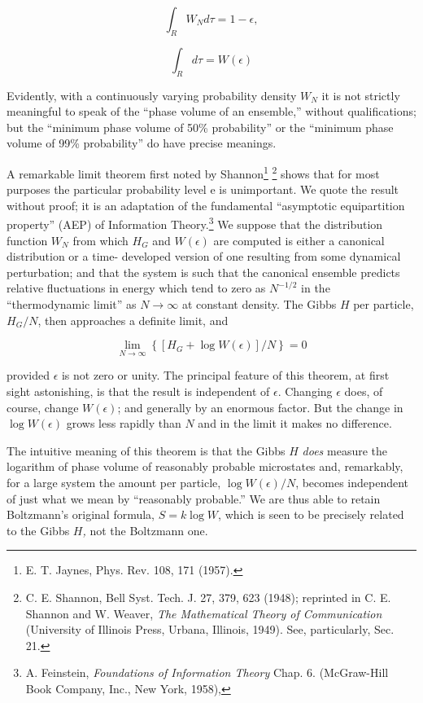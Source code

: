 \documentclass[twocolumn]{article}
\begin{document}
\[
\int_{R}W_{N} d\tau = 1 - \epsilon,
\]

\[
\int_{R} d\tau = W(\epsilon)
\]

Evidently, with a continuously varying probability density \(W_{N}\) it
is not strictly meaningful to speak of the ``phase volume of an
ensemble,'' without qualifications; but the ``minimum phase volume of
50\% probability'' or the ``minimum phase volume of 99\% probability''
do have precise meanings.

A remarkable limit theorem first noted by Shannon\footnote{E. T. Jaynes,
  Phys. Rev. 108, 171 (1957).} \footnote{C. E. Shannon, Bell Syst. Tech.
  J. 27, 379, 623 (1948); reprinted in C. E. Shannon and W. Weaver,
  \emph{The Mathematical Theory of Communication} (University of
  Illinois Press, Urbana, Illinois, 1949). See, particularly, Sec. 21.}
shows that for most purposes the particular probability level e is
unimportant. We quote the result without proof; it is an adaptation of
the fundamental ``asymptotic equipartition property'' (AEP) of
Information Theory.\footnote{A. Feinstein, \emph{Foundations of
  Information Theory} Chap. 6. (McGraw-Hill Book Company, Inc., New
  York, 1958),} We suppose that the distribution function \(W_{N}\) from
which \(H_{G}\) and \(W\left( \epsilon \right)\) are computed is either
a canonical distribution or a time- developed version of one resulting
from some dynamical perturbation; and that the system is such that the
canonical ensemble predicts relative fluctuations in energy which tend
to zero as \(N^{- 1/2}\) in the ``thermodynamic limit'' as
\(N \rightarrow \infty\) at constant density. The Gibbs \(H\) per
particle, \(H_{G}/N\), then approaches a definite limit, and

\begin{equation}
\lim_{N \rightarrow \infty}\left\{ \left\lbrack H_{G} + \log{W(\epsilon)} \right\rbrack/N \right\} = 0
\label{eqn-eighteen}
\end{equation}

provided \(\epsilon\) is not zero or unity. The principal feature of
this theorem, at first sight astonishing, is that the result is
independent of \(\epsilon\). Changing \(\epsilon\) does, of course,
change \(W\left( \epsilon \right)\); and generally by an enormous
factor. But the change in \(\log{W(\epsilon)}\) grows less rapidly than
\(N\) and in the limit it makes no difference.

The intuitive meaning of this theorem is that the Gibbs \(H\)
\emph{does} measure the logarithm of phase volume of reasonably probable
microstates and, remarkably, for a large system the amount per particle,
\(\log{W(\epsilon)/N}\), becomes independent of just what we mean by
``reasonably probable.'' We are thus able to retain Boltzmann's original
formula, \(S = k\log W\), which is seen to be precisely related to the
Gibbs \(H\)\emph{\textsc{,}} not the Boltzmann one.
\end{document}
